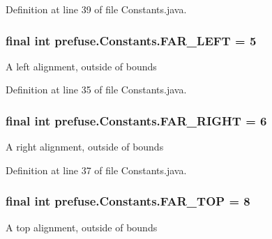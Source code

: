\-Definition at line 39 of file \-Constants.\-java.

\hypertarget{interfaceprefuse_1_1_constants_a0ef7bd3d9cbbb330e6d260d1b77729c8}{
\subsubsection[{\-F\-A\-R\-\_\-\-L\-E\-F\-T}]{\setlength{\rightskip}{0pt plus 5cm}final int {\bf prefuse.\-Constants.\-F\-A\-R\-\_\-\-L\-E\-F\-T} = 5}}\label{interfaceprefuse_1_1_constants_a0ef7bd3d9cbbb330e6d260d1b77729c8}
\-A left alignment, outside of bounds 

\-Definition at line 35 of file \-Constants.\-java.

\hypertarget{interfaceprefuse_1_1_constants_a1bba50f8d89facf24195425b9a1ea979}{
\subsubsection[{\-F\-A\-R\-\_\-\-R\-I\-G\-H\-T}]{\setlength{\rightskip}{0pt plus 5cm}final int {\bf prefuse.\-Constants.\-F\-A\-R\-\_\-\-R\-I\-G\-H\-T} = 6}}\label{interfaceprefuse_1_1_constants_a1bba50f8d89facf24195425b9a1ea979}
\-A right alignment, outside of bounds 

\-Definition at line 37 of file \-Constants.\-java.

\hypertarget{interfaceprefuse_1_1_constants_aaae3029a22766fb71e51db72448ed0c4}{
\subsubsection[{\-F\-A\-R\-\_\-\-T\-O\-P}]{\setlength{\rightskip}{0pt plus 5cm}final int {\bf prefuse.\-Constants.\-F\-A\-R\-\_\-\-T\-O\-P} = 8}}\label{interfaceprefuse_1_1_constants_aaae3029a22766fb71e51db72448ed0c4}
\-A top alignment, outside of bounds 

